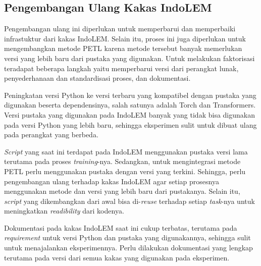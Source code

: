 \subsection{Pengembangan Ulang Kakas IndoLEM}

Pengembangan ulang ini diperlukan untuk memperbarui dan memperbaiki infrastuktur dari kakas IndoLEM. Selain itu, proses ini juga diperlukan untuk mengembangkan metode PETL karena metode tersebut banyak memerlukan versi yang lebih baru dari pustaka yang digunakan. Untuk melakukan faktorisasi teradapat beberapa langkah yaitu memperbarui versi dari perangkat lunak, penyederhanaan dan standardisasi proses, dan dokumentasi.

Peningkatan versi Python ke versi terbaru yang kompatibel dengan pustaka yang digunakan beserta dependensinya, salah satunya adalah Torch dan Transformers. Versi pustaka yang digunakan pada IndoLEM banyak yang tidak bisa digunakan pada versi Python yang lebih baru, sehingga eksperimen sulit untuk dibuat ulang pada perangkat yang berbeda. 

\textit{Script} yang saat ini terdapat pada IndoLEM menggunakan pustaka versi lama terutama pada proses \textit{training}-nya. Sedangkan, untuk mengintegrasi metode PETL perlu menggunakan pustaka dengan versi yang terkini. Sehingga, perlu pengembangan ulang terhadap kakas IndoLEM agar setiap prosesnya menggunakan metode dan versi yang lebih baru dari pustakanya. Selain itu, \textit{script} yang dikembangkan dari awal bisa di-\textit{reuse} terhadap setiap \textit{task}-nya untuk meningkatkan \textit{readibility} dari kodenya.

Dokumentasi pada kakas IndoLEM saat ini cukup terbatas, terutama pada \textit{requirement} untuk versi Python dan pustaka yang digunakannya, sehingga sulit untuk menajalankan eksperimennya. Perlu dilakukan dokumentasi yang lengkap terutama pada versi dari semua kakas yang digunakan pada eksperimen.